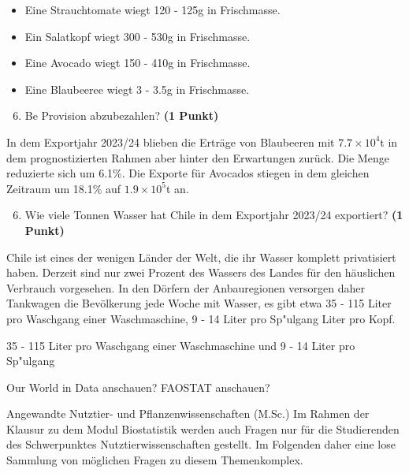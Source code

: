 \documentclass[a4paper, 9pt]{scrartcl}\usepackage[]{graphicx}\usepackage[]{xcolor}
\begin{document}
\begin{itemize}[noitemsep]
\item Eine Strauchtomate wiegt 120 - 125g in Frischmasse.
\item Ein Salatkopf wiegt 300 - 530g in Frischmasse.
\item Eine Avocado wiegt 150 - 410g in Frischmasse.
\item Eine Blaubeeree wiegt 3 - 3.5g in Frischmasse.
\end{itemize}

\begin{enumerate}
  \setcounter{enumi}{5}
\item Be
  Provision abzubezahlen? \textbf{(1 Punkt)}
\end{enumerate}

In dem Exportjahr 2023/24 blieben die Erträge von Blaubeeren mit
\ensuremath{7.7\times 10^{4}}t in dem prognostizierten Rahmen aber hinter den
Erwartungen zurück. Die Menge reduzierte sich um
6.1\%. Die Exporte für Avocados stiegen in dem gleichen
Zeitraum um 18.1\% auf
\ensuremath{1.9\times 10^{5}}t an.

\begin{enumerate}
  \setcounter{enumi}{5}
\item Wie viele Tonnen Wasser hat Chile in dem Exportjahr 2023/24 exportiert? \textbf{(1 Punkt)}
\end{enumerate}

Chile ist eines der wenigen Länder der Welt, die ihr Wasser komplett
privatisiert haben. Derzeit sind nur zwei Prozent des Wassers des Landes
für den häuslichen Verbrauch vorgesehen. In den Dörfern der
Anbauregionen versorgen daher Tankwagen die Bevölkerung jede Woche mit Wasser, es
gibt etwa 35 - 115 Liter pro Waschgang einer Waschmaschine, 9 - 14 Liter pro Sp{"u}lgang Liter pro Kopf.

35 - 115 Liter pro Waschgang einer Waschmaschine und 9 - 14 Liter pro Sp{"u}lgang

Our World in Data anschauen?
FAOSTAT anschauen?

\clearpage
\begin{graybox}{Angewandte Nutztier- und Pflanzenwissenschaften (M.Sc.)}
  Im Rahmen der Klausur zu dem Modul Biostatistik werden auch Fragen
  nur f{\"u}r die Studierenden des Schwerpunktes Nutztierwissenschaften
  gestellt. Im Folgenden daher eine lose Sammlung von m{\"o}glichen Fragen zu
  diesem Themenkomplex.
\end{graybox}
\clearpage
\end{document}
